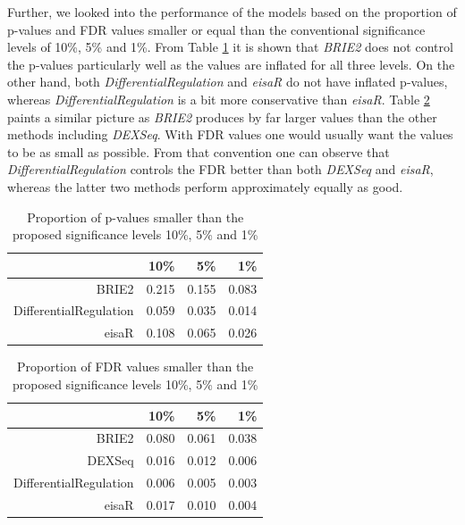 Further, we looked into the performance of the models based on the proportion of p-values and FDR values smaller or equal than the conventional significance levels of 10\%, 5\% and 1\%. From Table \ref{tab:p_val} it is shown that \emph{BRIE2} does not control the p-values particularly well as the values are inflated for all three levels. On the other hand, both \emph{DifferentialRegulation} and \emph{eisaR} do not have inflated p-values, whereas \emph{DifferentialRegulation} is a bit more conservative than \emph{eisaR}. Table \ref{tab:fdr} paints a similar picture as \emph{BRIE2} produces by far larger values than the other methods including \emph{DEXSeq}. With FDR values one would usually want the values to be as small as possible. From that convention one can observe that \emph{DifferentialRegulation} controls the FDR better than both \emph{DEXSeq} and \emph{eisaR}, whereas the latter two methods perform approximately equally as good.

\begin{table}[!htb]
\centering
\caption{Proportion of p-values smaller than the proposed significance levels 10\%, 5\% and 1\%}
\begin{tabular}{rrrr}
  \hline
	& 10\% & 5\% & 1\% \\ 
  \hline
	BRIE2 & 0.215 & 0.155 & 0.083 \\ 
  DifferentialRegulation & 0.059 & 0.035 & 0.014 \\ 
  eisaR & 0.108 & 0.065 & 0.026 \\ 
   \hline
\end{tabular}
\label{tab:p_val}
\end{table}

\begin{table}[!htb]
\centering
\caption{Proportion of FDR values smaller than the proposed significance levels 10\%, 5\% and 1\%}
\begin{tabular}{rrrr}
  \hline
	& 10\% & 5\% & 1\% \\
  \hline
	BRIE2 & 0.080 & 0.061 & 0.038 \\ 
  DEXSeq & 0.016 & 0.012 & 0.006 \\ 
  DifferentialRegulation & 0.006 & 0.005 & 0.003 \\ 
  eisaR & 0.017 & 0.010 & 0.004 \\ 
   \hline
\end{tabular}
\label{tab:fdr}
\end{table}
\FloatBarrier

